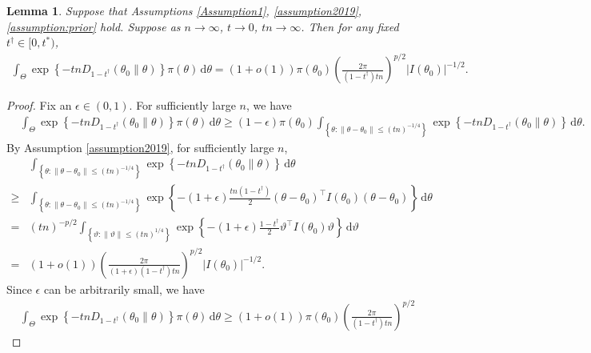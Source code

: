 \documentclass[11pt]{article}
\newcommand{\myT}{\intercal}
\theoremstyle{plain}
\newtheorem{lemma}{\quad\quad Lemma}
\theoremstyle{definition}
\theoremstyle{remark}
\begin{document}
\begin{appendices}
\begin{lemma}
    Suppose that Assumptions \ref{Assumption1}, \ref{assumption2019}, \ref{assumption:prior} hold.
    Suppose as $n \to \infty$, $t \to 0$, $tn \to \infty$.
    Then for any fixed $t^\dagger \in [0,t^*)$, 
\begin{align*}
    \int_{\Theta} \exp\left\{ -tn D_{1-t^\dagger} \left( \theta_0 \| \theta \right) \right\} \pi(\theta) \, \mathrm d \theta= (1+o(1))\pi(\theta_0)
    \left( 
        \frac{2\pi}{(1-t^\dagger) tn}
    \right)^{p/2}
    | I (\theta_0) |^{-1/2}. 
\end{align*}
    \label{lemma:2019}
\end{lemma}
\begin{proof}
    Fix an $\epsilon \in (0,1)$.
    For sufficiently large $n$, we have
\begin{align*}
    &\int_{\Theta} \exp\left\{ -tn D_{1-t^\dagger} (\theta_0 \| \theta) \right\} \pi(\theta) \, \mathrm d \theta
    \geq
    (1-\epsilon)\pi(\theta_0)
    \int_{ \left\{ \theta: \|\theta - \theta_0\|\leq (tn)^{-1/4} \right\}} \exp\left\{ -tn D_{1-t^\dagger} (\theta_0 \| \theta) \right\}  \, \mathrm d \theta.
\end{align*}
By Assumption \ref{assumption2019}, for sufficiently large $n$,
\begin{align*}
    &\int_{ \left\{ \theta: \|\theta - \theta_0\|\leq (tn)^{-1/4} \right\}} \exp\left\{ -tn D_{1-t^\dagger} (\theta_0 \| \theta) \right\}  \, \mathrm d \theta
    \\
    \geq
    &\int_{ \left\{ \theta: \|\theta - \theta_0\|\leq (tn)^{-1/4} \right\}} \exp \left\{ - (1+\epsilon) \frac{tn(1-t^\dagger)}{2} (\theta- \theta_0)^\myT I(\theta_0) (\theta- \theta_0) \right\}   \, \mathrm d \theta
    \\
    =
    & (tn)^{-p/2} \int_{ \left\{ \vartheta: \|\vartheta\|\leq (tn)^{1/4} \right\}} \exp \left\{ - (1+\epsilon) \frac{1-t^\dagger}{2} \vartheta^\myT I(\theta_0) \vartheta \right\} \, \mathrm d \vartheta
    \\
    =
    &
    (1+o(1))
    \left( 
        \frac{2\pi}{(1+\epsilon)(1-t^\dagger) tn}
    \right)^{p/2}
    |I(\theta_0)|^{-1/2}
    .
\end{align*}
Since $\epsilon$ can be arbitrarily small, we have
\begin{align*}
    &\int_{\Theta} \exp\left\{ -tn D_{1-t^\dagger} (\theta_0 \| \theta) \right\} \pi(\theta) \, \mathrm d \theta
    \geq (1+o(1))
    \pi(\theta_0)
    \left( 
        \frac{2\pi}{(1-t^\dagger) tn}
    \right)^{p/2}

\end{align*}
\end{proof}
\end{appendices}
\end{document}
